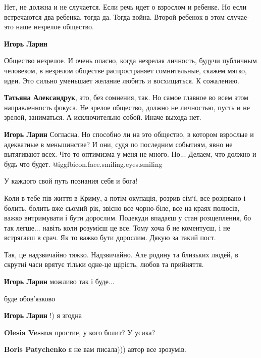 \begin{itemize}
\begin{itemize}
Нет, не должна и не случается. Если речь идет о взрослом и ребенке.
Но если встречаются два ребенка, тогда да. Тогда война.
Второй ребенок в этом случае-это наше незрелое общество.

\textbf{Игорь Ларин} 

Общество незрелое. И очень опасно, когда незрелая личность, будучи публичным
человеком, в незрелом обществе распространяет сомнительные, скажем мягко, идеи.
Это сильно уменьшает желание любить и восхищаться. К сожалению.

\textbf{Татьяна Александрук}, это, без сомнения, так.
Но самое главное во всем этом направленность фокуса.
Не зрелое общество, должно не личностью, пусть и не зрелой, заниматься. А исключительно собой.
Иначе выхода нет.

\textbf{Игорь Ларин} Согласна. Но способно ли на это общество, в котором взрослые и адекватные в меньшинстве? И они, судя по последним событиям, явно не вытягивают всех. Что-то оптимизма у меня не много. Но... Делаем, что должно и будь что будет. @igg{fbicon.face.smiling.eyes.smiling} 
\end{itemize} %

У каждого свой путь познания себя и бога!


Коли в тебе пів життя в Криму, а потім окупація, розрив сім‘ї, все розірвано і
болить, болить вже сьомий рік, звісно все чорно-біле, все на краях полюсів,
важко витримувати і бути дорослим. Подекуди впадаєш у стан розщеплення, бо так
легше... навіть коли розумієш це все. Тому хоча б не коментуєш, і не встрягаєш в
срач. Як то важко бути дорослим. Дякую за такий пост.

\begin{itemize} %
Так, це надзвичайно тяжко. Надзвичайно. Але родину та близьких людей, в скрутні
часи врятує тільки одне-це щірість, любов та прийняття.

\textbf{Игорь Ларин} можливо так і буде...


буде обов’язково

\textbf{Игорь Ларин} !) я згодна

\textbf{Olesia Vessna} простие, у кого болит? У усика?

\textbf{Boris Patychenko} я не вам писала))) автор все зрозумів.
\end{itemize} %


\end{itemize}
